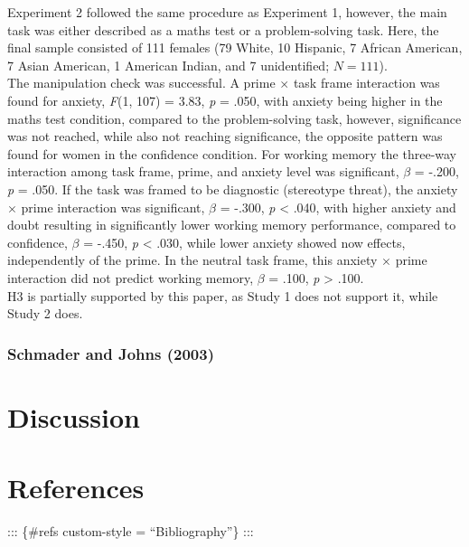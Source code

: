 \documentclass[
  stu,floatsintext]{apa7}
\begin{document}
Experiment 2 followed the same procedure as Experiment 1, however, the main task was either described as a maths test or a problem-solving task.
Here, the final sample consisted of 111 females (79 White, 10 Hispanic, 7 African American, 7 Asian American, 1 American Indian, and 7 unidentified; \(N = 111\)).\\
The manipulation check was successful.
A prime \(\times\) task frame interaction was found for anxiety, \emph{F}(1, 107) = 3.83, \emph{p} = .050, with anxiety being higher in the maths test condition, compared to the problem-solving task, however, significance was not reached, while also not reaching significance, the opposite pattern was found for women in the confidence condition.
For working memory the three-way interaction among task frame, prime, and anxiety level was significant, \(\beta\) = -.200, \emph{p} = .050.
If the task was framed to be diagnostic (stereotype threat), the anxiety \(\times\) prime interaction was significant, \(\beta\) = -.300, \emph{p} \textless{} .040, with higher anxiety and doubt resulting in significantly lower working memory performance, compared to confidence, \(\beta\) = -.450, \emph{p} \textless{} .030, while lower anxiety showed now effects, independently of the prime.
In the neutral task frame, this anxiety \(\times\) prime interaction did not predict working memory, \(\beta\) = .100, \emph{p} \textgreater{} .100.\\
H3 is partially supported by this paper, as Study 1 does not support it, while Study 2 does.

\subsubsection{Schmader and Johns (2003)}\label{schmaderconvergingevidencethat2003}

\section{Discussion}\label{discussion}

\newpage

\section{References}\label{references}

::: \{\#refs custom-style = ``Bibliography''\}
:::
\end{document}
